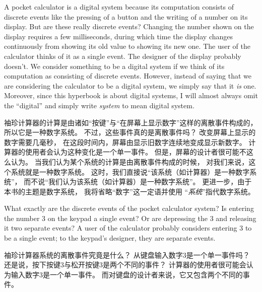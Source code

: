 \begin{en}
A pocket calculator is a digital system because its computation
consists of discrete events like the pressing of a button and the
writing of a number on its display.  But are these really discrete
events?  Changing the number shown on the display requires a few
milliseconds, during which time the display changes continuously from
showing its old value to showing its new one.  The user of the
calculator thinks of it as a single event.  The designer of the
display probably doesn't.  We consider something to be a digital
system if we think of its computation as consisting of discrete
events.  However, instead of saying that we are considering the
calculator to be a digital system, we simply say that it \emph{is}
one.  Moreover, since this hyperbook is about digital systems, I will
almost always omit the ``digital'' and simply write 
\emph{system} to mean digital system.
\end{en}

\begin{ch}
  袖珍计算器的计算是由诸如``按键''与``在屏幕上显示数字''这样的离散事件构成的，
  所以它是一种数字系统。
  不过，这些事件真的是离散事件吗？
  改变屏幕上显示的数字需要几毫秒，
  在这段时间内，屏幕由显示旧数字连续地变成显示新数字。
  计算器的使用者会认为这种变化是一个单一事件。
  但是，屏幕的设计者很可能不这么认为。
  当我们认为某个系统的计算是由离散事件构成的时候，
  对我们来说，这个系统就是一种数字系统。
  这时，我们直接说``该系统（如计算器）是一种数字系统''，
  而不说``我们认为该系统（如计算器）是一种数字系统''。
  更进一步，由于本书的主题是数字系统，
  我将省略``数字''这一定语并使用%
  ``\emph{系统}''指代数字系统。
\end{ch}

\begin{en}
What exactly are the discrete events of the pocket calculator system?
Is entering the number 3 on the keypad a single event?  Or are
depressing the 3 and releasing it two separate events?  A user of the
calculator probably considers entering 3 to be a single event; to the
keypad's designer, they are separate events.  
\end{en}

\begin{ch}
  袖珍计算器系统的离散事件究竟是什么？
  从键盘输入数字$3$是一个单一事件吗？
  还是说，按下按键$3$与松开按键$3$是两个不同的事件？
  计算器的使用者很可能会认为输入数字$3$是一个单一事件。
  而对键盘的设计者来说，它又包含两个不同的事件。
\end{ch}

